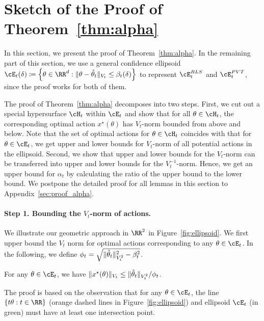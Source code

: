 \section{Sketch of the Proof of Theorem~\ref{thm:alpha}}
\label{sec:proof_sketch_alpha}
In this section, we present the proof of Theorem~\ref{thm:alpha}.  In the remaining part of this section, we use a general confidence ellipsoid  $\cE_t  (\delta)\coloneqq \left \{\theta \in \RR^d: \|\theta - \hparam_t\|_{V_t}\leq \beta_t(\delta)\right \}$ to represent $\cE^{\RLS}_t$ and $\cE^{\PVT}_t$, since the proof works for both of them. 

The proof of Theorem~\ref{thm:alpha} decomposes into two steps. First, we cut out a special hypersurface  $\cH_t$ within  $\cE_t$ and show that for all $\theta \in \cH_t$, the corresponding optimal action $x^\star(\theta)$ has $V_t$-norm bounded from above and below. Note that the set of optimal actions for  $\theta \in \cH_t$ coincides with that for  $\theta \in \cE_t$, we get upper and lower bounds for  $V_t$-norm of all potential actions in the ellipsoid. Second, we show that upper and lower bounds for the $V_t$-norm can be transferred into upper and lower bounds for the $V_t^{-1}$-norm. Hence, we get an upper bound for $\alpha_t$ by calculating the ratio of the upper bound to the lower bound. We postpone the detailed proof for all lemmas in this section to Appendix~\ref{sec:proof_alpha}.





\paragraph{Step 1. Bounding the $V_t$-norm of actions.}
We illustrate our geometric approach in $\RR^2$ in Figure~\ref{fig:ellipsoid}. We first upper bound the  $V_t$ norm for optimal actions corresponding to any $\theta\in \cE_t$. In the following, we define
$
\phi_t	 = \sqrt{ \|\hat{\theta}_t\|_{V_t^2}^2 - \beta_t^2 }
$.  


\begin{lemma}\label{lem:Vt_norm_upper}
For any $\theta\in \cE_t$, we have
	$
	\|x^\star(\theta )\|_{V_t} \leq  \|\hat{\theta}_t\|_{V_t^2}/\phi_t$.
\end{lemma}
The proof is based on the observation that for any $\theta\in \cE_t$, the line $\{t \theta: t\in\RR \}$ (orange dashed lines in Figure~\ref{fig:ellipsoid}) and ellipsoid $\cE_t$  (in green) must have at least one intersection point.



